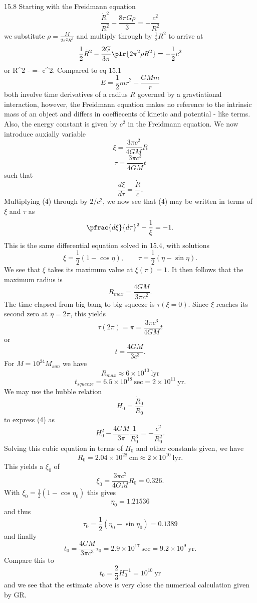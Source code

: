 \documentclass[10pt,letterpaper]{article}
\begin{document}
\item[15.8]
Starting with the Freidmann equation
\[
	\frac{\dot R^2}{R^2} - \frac{8\pi G\rho}{3}  = -\frac{c^2}{R^2}
\]
we substitute $\rho = \frac{M}{2\pi ^2 R^3}$ and multiply through by $\frac12 R^2$ to arrive at
\[
	\frac12 \dot R^2-\frac{2G}{3\pi}\plr{2\pi^2\rho R^2} = -\frac12 c^2
\]
or
\be
	 \dot R^2 - =- c^2.
\ee
Compared to eq 15.1
\[
	E = \frac 12 m\dot r^2 - \frac{GMm}{r}
\]
both involve time derivatives of a radius $R$ governed by a gravtiational interaction, however, the Freidmann equation makes no reference to the intrinsic mass of an object and differs in coeffiecents of kinetic and potential - like terms. Also, the energy constant is given by $c^2$ in the Freidmann equation. We now introduce auxially variable
\[
	\xi = \frac{3\pi c^2}{4GM}R
\]
\[
	\tau = \frac{3\pi c^3}{4GM}t
\]
such that 
\[
	\frac{d\xi}{d\tau} = \frac{\dot R}{c}.
\]
Multiplying (4) through by $2/c^2$, we now see that (4) may be written in terms of $\xi$ and $\tau$ as
\[
	\pfrac{d\xi}{d\tau}^2 - \frac{1}{\xi} = -1.
\]
This is the same differential equation solved in 15.4, with solutions
\[
	\xi = \frac12 (1-\cos\eta),\qquad \tau = \frac12 (\eta-\sin\eta).
\]
We see that $\xi$ takes its maximum value at $\xi(\pi) = 1$. It then follows that the maximum radius is
\[
	R_{max} = \frac{4GM}{3\pi c^2}.
\]
The time elapsed from big bang to big squeeze is $\tau(\xi = 0)$. Since $\xi$ reaches its second zero at $\eta = 2\pi$, this yields
\[
	\tau(2\pi) = \pi = \frac{3\pi c^3}{4GM}t
\]
or
\[
	t= \frac{4GM}{3c^3}.
\]
For $M = 10^{24}M_{sun}$ we have
\[
	R_{max} \approx 6\times 10^{10}\ \text{lyr}
\]
\[
	t_{squeeze} = 6.5\times 10^{18}\ \text{sec} = 2\times 10^{11}\ \text{yr}.
\]
We may use the hubble relation
\[
	H_0 = \frac{\dot R_0}{R_0}
\]
to express (4) as
\[
	H_0^2 - \frac{4GM}{3\pi}\frac{1}{R_0^3} = -\frac{c^2}{R_0^2}.
\]
Solving this cubic equation in terms of $H_0$ and other constants given, we have
\[
	R_0 = 2.04\times 10^{28}\ \text{cm} \approx 2\times 10^{10}\ \text{lyr}.
\]
This yields a $\xi_0$ of
\[
	\xi_0 =  \frac{3\pi c^2}{4GM}R_0 = 0.326.
\]
With $\xi_0 = \frac12(1-\cos\eta_0)$ this gives
\[
	\eta_0 = 1.21536
\]
and thus
\[
	\tau_0 = \frac12(\eta_0-\sin\eta_0) = 0.1389
\]
and finally
\[
	t_0 = \frac{4GM}{3\pi c^3}\tau_0 =2.9\times 10^{17}\ \text{sec} = 9.2\times 10^9\ \text{yr}.
\] 
Compare this to 
\[
	t_0 = \frac23 H_0^{-1} = 10^{10}\ \text{yr}
\]
and we see that the estimate above is very close the numerical calculation given by GR. 
\\ \\
\end{document}
